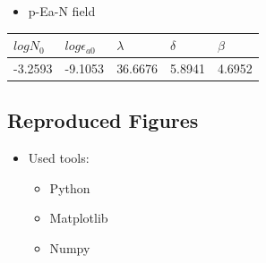 \documentclass[11pt]{article}
\providecommand{\tightlist}{%
      \setlength{\itemsep}{0pt}\setlength{\parskip}{0pt}}
\begin{document}
\begin{itemize}
\tightlist
\item
  p-Ea-N field
\end{itemize}

\begin{longtable}[]{@{}lllll@{}}
\toprule
\(logN_0\) & \(log\epsilon_{a0}\) & \(\lambda\) & \(\delta\) &
\(\beta\)\tabularnewline
\midrule
\endhead
-3.2593 & -9.1053 & 36.6676 & 5.8941 & 4.6952\tabularnewline
\bottomrule
\end{longtable}

\hypertarget{reproduced-figures}{%
\subsection{Reproduced Figures}\label{reproduced-figures}}

\begin{itemize}
\tightlist
\item
  Used tools:

  \begin{itemize}
  \tightlist
  \item
    Python
  \item
    Matplotlib
  \item
    Numpy
  \end{itemize}
\end{itemize}
\end{document}
